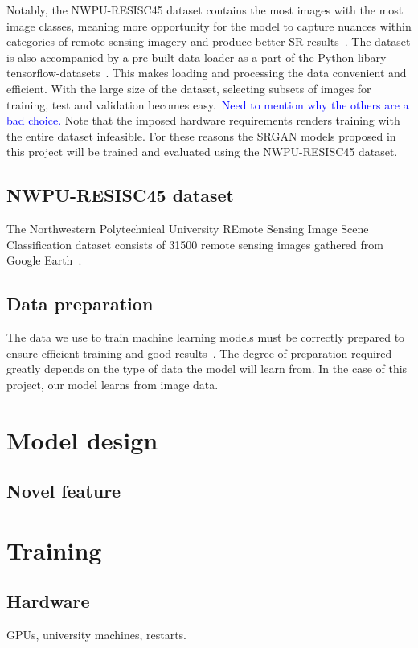 Notably, the NWPU-RESISC45 dataset contains the most images with the most image classes, meaning more opportunity for the model to capture nuances within categories of remote sensing imagery and produce better SR results~\cite{ref}. The dataset is also accompanied by a pre-built data loader as a part of the Python libary tensorflow-datasets~\cite{ref}. This makes loading and processing the data convenient and efficient. With the large size of the dataset, selecting subsets of images for training, test and validation becomes easy.\ \textcolor{blue}{Need to mention why the others are a bad choice.} Note that the imposed hardware requirements renders training with the entire dataset infeasible. For these reasons the SRGAN models proposed in this project will be trained and evaluated using the NWPU-RESISC45 dataset.

\subsection{NWPU-RESISC45 dataset}
The Northwestern Polytechnical University REmote Sensing Image Scene Classification dataset consists of 31500 remote sensing images gathered from Google Earth~\cite{resisc45}. 

\subsection{Data preparation}
The data we use to train machine learning models must be correctly prepared to ensure efficient training and good results~\cite{ref}. The degree of preparation required greatly depends on the type of data the model will learn from. In the case of this project, our model learns from image data.

\section{Model design}

\subsection{Novel feature}

\section{Training}

\subsection{Hardware}
GPUs, university machines, restarts.

